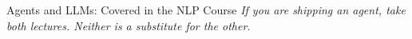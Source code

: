 \begin{frame}{Agents and LLMs: Covered in the NLP Course}
    \vspace{0.7em}
    \centering
    \textit{If you are shipping an agent, take both lectures. Neither is a substitute for the other.}
\end{frame}
